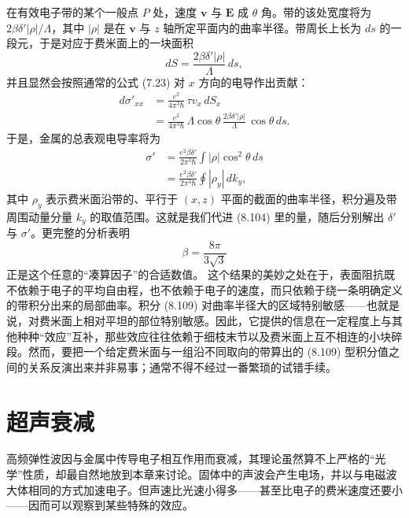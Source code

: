 在有效电子带的某个一般点 $P$ 处，速度 $\mathbf{v}$ 与 $\mathbf{E}$ 成 $\theta$ 角。带的该处宽度将为 $2\beta\delta'|\rho|/\Lambda$，其中 $|\rho|$ 是在 $\mathbf{v}$ 与 $z$ 轴所定平面内的曲率半径。带周长上长为 $ds$ 的一段元，于是对应于费米面上的一块面积
\begin{equation*}
dS = \frac{2\beta\delta'|\rho|}{\Lambda}\,ds, \tag{8.107}
\end{equation*}
并且显然会按照通常的公式 (7.23) 对 $x$ 方向的电导作出贡献：
\begin{align*}
d\sigma'_{xx} &= \frac{e^2}{4\pi^3\hbar}\,\tau v_x\,dS_x \\
&= \frac{e^2}{4\pi^3\hbar}\,\Lambda\cos\theta\,\frac{2\beta\delta'|\rho|}{\Lambda}\,\cos\theta\,ds. \tag{8.108}
\end{align*}
于是，金属的总表观电导率将为
\begin{align*}
\sigma' &= \frac{e^2\beta\delta'}{2\pi^3\hbar}\int |\rho|\cos^2\theta\,ds \\
&= \frac{e^2\beta\delta'}{2\pi^3\hbar}\oint |\rho_y|\,dk_y, \tag{8.109}
\end{align*}
其中 $\rho_y$ 表示费米面沿带的、平行于 $(x,z)$ 平面的截面的曲率半径，积分遍及带周围动量分量 $k_y$ 的取值范围。这就是我们代进 (8.104) 里的量，随后分别解出 $\delta'$ 与 $\sigma'$。更完整的分析表明
\begin{equation*}
\beta = \frac{8\pi}{3\sqrt{3}} \tag{8.110}
\end{equation*}
正是这个任意的“凑算因子”的合适数值。
这个结果的美妙之处在于，表面阻抗既不依赖于电子的平均自由程，也不依赖于电子的速度，而只依赖于绕一条明确定义的带积分出来的局部曲率。积分 (8.109) 对曲率半径大的区域特别敏感——也就是说，对费米面上相对平坦的部位特别敏感。因此，它提供的信息在一定程度上与其他种种“效应”互补，那些效应往往依赖于细枝末节以及费米面上互不相连的小块碎段。然而，要把一个给定费米面与一组沿不同取向的带算出的 (8.109) 型积分值之间的关系反演出来并非易事；通常不得不经过一番繁琐的试错手续。

\section{超声衰减}

高频弹性波因与金属中传导电子相互作用而衰减，其理论虽然算不上严格的“光学”性质，却最自然地放到本章来讨论。固体中的声波会产生电场，并以与电磁波大体相同的方式加速电子。但声速比光速小得多——甚至比电子的费米速度还要小——因而可以观察到某些特殊的效应。

